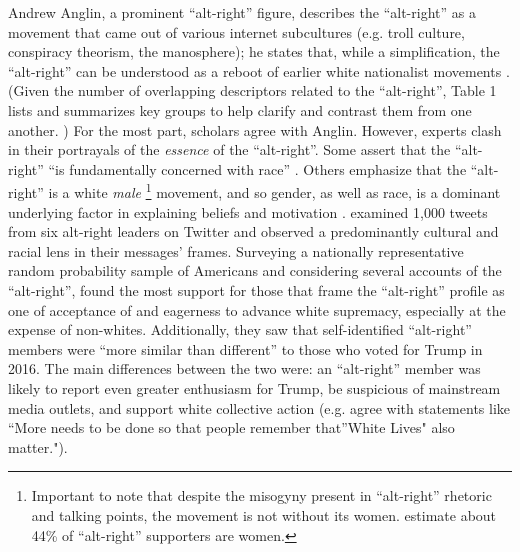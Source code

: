 \documentclass[acmlarge, screen, authorversion]{acmart}
\begin{document}
Andrew Anglin, a prominent “alt-right” figure, describes the “alt-right”
as a movement that came out of various internet subcultures (e.g. troll
culture, conspiracy theorism, the manosphere); he states that, while a
simplification, the “alt-right” can be understood as a reboot of earlier
white nationalist movements \cite{andrewanglinNormieGuideAltRight}. (Given the number of
overlapping descriptors related to the “alt-right”, Table 1 lists and
summarizes key groups to help clarify and contrast them from one
another. ) For the most part, scholars agree with Anglin.
However, experts clash in their portrayals of the \textit{essence} of the ``alt-right''\cite{forscherPsychologicalProfileAltRight2020}. Some assert that the “alt-right” “is fundamentally concerned
with race” \cite{hawleyMakingSenseAltright2017}. Others emphasize that the ``alt-right” is a white
\textit{male} \footnote{Important to note that despite the misogyny present in
“alt-right” rhetoric and talking points, the movement is not without its
women. \citet{forscherPsychologicalProfileAltRight2020} estimate about 44\% of “alt-right”
supporters are women.}
movement, and so gender, as well as race, is a dominant underlying
factor in explaining beliefs and motivation \cite{kuszWinningBiglySporting2019}. \citet{gallaherMainstreamingWhiteSupremacy2020}
examined 1,000 tweets from six alt-right leaders on Twitter and observed
a predominantly cultural and racial lens in their messages’ frames.
Surveying a nationally representative random probability sample of
Americans and considering several accounts of the “alt-right”,
\citet{forscherPsychologicalProfileAltRight2020} found the most support for those that frame
the “alt-right” profile as one of acceptance of and eagerness to advance
white supremacy, especially at the expense of non-whites. Additionally,
they saw that self-identified “alt-right” members were “more similar
than different” to those who voted for Trump in 2016. The main
differences between the two were: an ``alt-right” member was likely to
report even greater enthusiasm for Trump, be suspicious of mainstream
media outlets, and support white collective action (e.g. agree with
statements like “More needs to be done so that people remember
that”White Lives" also matter.").
\end{document}
